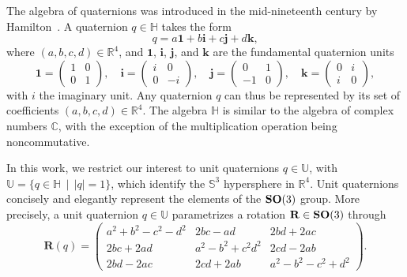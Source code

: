 The algebra of quaternions was introduced in the mid-nineteenth century by Hamilton~\cite{rosenfeld_history_1988}. A quaternion $q\in\mathbb{H}$ takes the form
\begin{equation}
    \label{eq:quaternion-definition}
    q =  a\boldsymbol{1} + b\boldsymbol{i} + c\boldsymbol{j} + d\boldsymbol{k},
    \end{equation}
where $(a,b,c,d)\in\mathbb{R}^4$, and $\boldsymbol{1}$, $\boldsymbol{i}$, $\boldsymbol{j}$, and $\boldsymbol{k}$ are the fundamental quaternion units
\begin{equation}
    \label{eq:quaternion-units}
    \boldsymbol{1} = \begin{pmatrix} 1 & 0 \\ 0 & 1 \end{pmatrix}, \quad
    \boldsymbol{i} = \begin{pmatrix} i & 0 \\ 0 & -i \end{pmatrix}, \quad
    \boldsymbol{j} = \begin{pmatrix} 0 & 1 \\ -1 & 0 \end{pmatrix}, \quad
    \boldsymbol{k} = \begin{pmatrix} 0 & i \\ i & 0 \end{pmatrix},
\end{equation}
with $i$ the imaginary unit. Any quaternion $q$ can thus be represented by its set of coefficients $(a,b,c,d)\in\mathbb{R}^4$. The algebra $\mathbb{H}$ is similar to the algebra of complex numbers $\mathbb{C}$, with the exception of the multiplication operation being noncommutative.

In this work, we restrict our interest to unit quaternions $q\in\mathbb{U}$, with  $\mathbb{U}=\big\{q\in\mathbb{H} \; \, | \; \,\lvert q \rvert =1\big\}$, which identify the $\mathbb{S}^3$ hypersphere in  $\mathbb{R}^4$. Unit quaternions concisely and elegantly represent the elements of the $\mathrm{\mathbf{SO}}(3)$ group. More precisely, a unit quaternion $q\in\mathbb{U}$ parametrizes a rotation $\mathbf{R}\in\mathrm{\mathbf{SO}}(3)$ through
\begin{equation}
    \mathbf{R}(q) =\begin{pmatrix}
    a^2+b^2-c^2-d^2 & 2bc-ad & 2bd+2ac  \\
    2bc+2ad & a^2-b^2+c^2d^2 & 2cd-2ab \\
    2bd-2ac & 2cd+2ab & a^2-b^2-c^2+d^2
    \end{pmatrix}.
    \label{eq:quaternion-rotation-matrix}
\end{equation}

